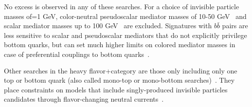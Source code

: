 No excess is observed in any of these searches. 
For a choice of invisible particle masses of=1 GeV, color-neutral pseudoscalar mediator masses of 10-50 GeV~\cite{AAaboud:2017aeu} and scalar mediator masses up to 100 GeV~\cite{CMS-PAS-SUS-17-001} are excluded. %
Signatures with $b\bar{b}$ pairs are less sensitive to scalar and pseudoscalar mediators that do not explicitly privilege bottom quarks, but can set much higher limits on colored mediator masses in case of preferential couplings to bottom quarks~\cite{Agrawal:2014una}. 


Other searches in the heavy flavor+\MET category are those only including only one top or bottom quark (also called mono-top or mono-bottom searches)~\cite{Sirunyan:2018gka, Aad:2014wza}.
They place constraints on models that include singly-produced invisible particles candidates through flavor-changing neutral currents~\cite{Boucheneb:2014wza}. 



